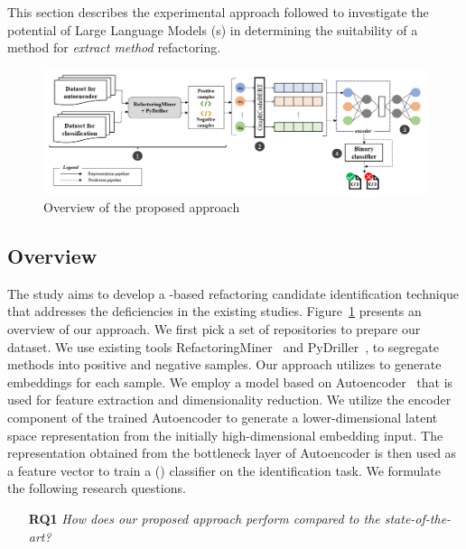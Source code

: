 This section describes the experimental approach followed to investigate the potential of Large Language Models (\llm{}s) in determining the suitability of a method for \textit{extract method} refactoring.

\begin{figure}
\centering
\centerline{\includegraphics[width=\textwidth]{chapters/identification/Images/ArchDiagram.png}}
\caption{Overview of the proposed approach}
\label{fig:methodology}
\end{figure}
\subsection{Overview}
The study aims to develop a \dl{}-based \exm{} refactoring candidate identification technique that addresses the deficiencies in the existing studies.
Figure~\ref{fig:methodology} presents an overview of our approach.
We first pick a set of repositories to prepare our dataset.
We use existing tools RefactoringMiner~\cite{Tsantalis:ICSE:2018:RefactoringMiner} and PyDriller~\cite{Spadini2018}, to segregate methods into positive and negative samples.
Our approach utilizes \GCB{} to generate embeddings for each sample.
We employ a \dl{} model based on Autoencoder~\cite{Liou2014Autoencoder} that is used for feature extraction and dimensionality reduction. 
We utilize the encoder component of the trained Autoencoder to generate a lower-dimensional latent space representation from the initially high-dimensional embedding input. 
The representation obtained from the bottleneck layer of Autoencoder is then used as a feature vector to train a \rf{} (\RF{}) classifier on the \exm{} identification task.
We formulate the following research questions.


\begin{itemize}
    \item [\textbf{RQ1}] 
    \textit{How does our proposed approach perform compared to the state-of-the-art?}
\end{itemize}    

